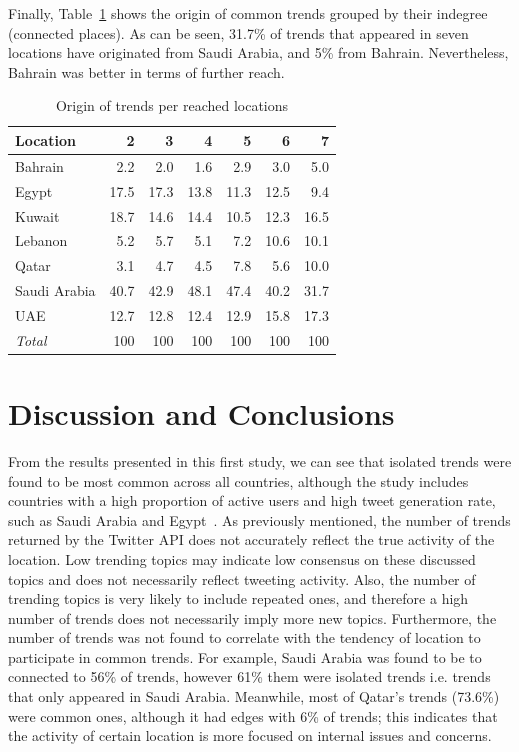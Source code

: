 \documentclass{llncs}
\begin{document}
Finally, Table~\ref{tbl:trendorigin} shows the origin of common trends
grouped by their indegree (connected places). As can be seen, 31.7\%
of trends that appeared in seven locations have originated from Saudi
Arabia, and 5\% from Bahrain. Nevertheless, Bahrain was better in
terms of further reach.

\begin{table}[!h]
\centering
\caption{Origin of trends per reached locations}
\begin{tabular}{@{}lrrrrrr@{}}
\toprule
Location & 2 & 3 & 4 & 5 & 6 & 7 \\ 
\midrule
Bahrain &           2.2 &   2.0 &   1.6 &   2.9 &   3.0 &    5.0 \\
Egypt &            17.5 & 17.3 & 13.8 & 11.3 & 12.5 &    9.4\\
Kuwait &          18.7 & 14.6  & 14.4 & 10.5 & 12.3 & 16.5\\
Lebanon &         5.2 &   5.7 &    5.1 &   7.2 & 10.6 & 10.1 \\
Qatar &              3.1 &   4.7 &    4.5 &   7.8 &   5.6 & 10.0 \\
Saudi Arabia & 40.7 & 42.9 &  48.1 & 47.4 & 40.2 & 31.7 \\
UAE &              12.7 & 12.8 &  12.4 & 12.9 & 15.8 & 17.3 \\
\midrule
{\emph{Total}} & 100 & 100 & 100 & 100 & 100 &  100 \\
\bottomrule
\end{tabular}
\label{tbl:trendorigin}
\end{table}

\vspace{-2em}
\section{Discussion and Conclusions}\label{dissconc}

From the results presented in this first study, we can see that
isolated trends were found to be most common across all countries,
although the study includes countries with a high proportion of active
users and high tweet generation rate, such as Saudi Arabia and
Egypt~\cite{Salem2017}. As previously mentioned, the number of trends
returned by the Twitter API does not accurately reflect the true
activity of the location. Low trending topics may indicate low
consensus on these discussed topics and does not necessarily reflect
tweeting activity. Also, the number of trending topics is very likely
to include repeated ones, and therefore a high number of trends does
not necessarily imply more new topics. Furthermore, the number of
trends was not found to correlate with the tendency of location to
participate in common trends. For example, Saudi Arabia was found to
be to connected to 56\% of trends, however 61\% them were isolated
trends i.e. trends that only appeared in Saudi Arabia. Meanwhile, most
of Qatar's trends (73.6\%) were common ones, although it had edges
with 6\% of trends; this indicates that the activity of certain
location is more focused on internal issues and concerns.
\end{document}
